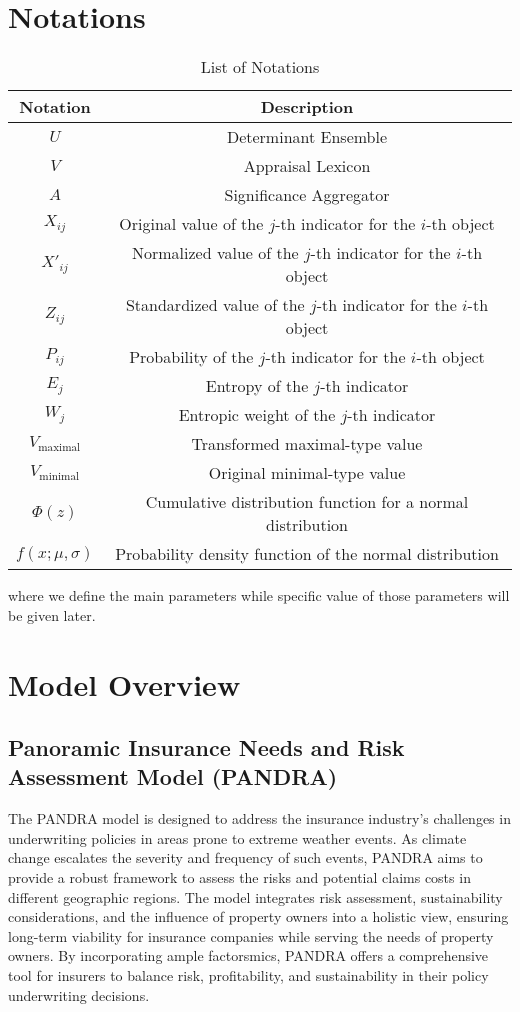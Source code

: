 \documentclass{mcmthesis}
\begin{document}
\section{Notations}
\begin{table}[h]
    \centering
    \caption{List of Notations}
    \begin{tabular}{|c|c|}
    \hline
    \textbf{Notation} & \textbf{Description} \\
    \hline
    $U$ & Determinant Ensemble \\
    $V$ & Appraisal Lexicon \\
    $A$ & Significance Aggregator \\
    $X_{ij}$ & Original value of the $j$-th indicator for the $i$-th object \\
    $X'_{ij}$ & Normalized value of the $j$-th indicator for the $i$-th object \\
    $Z_{ij}$ & Standardized value of the $j$-th indicator for the $i$-th object \\
    $P_{ij}$ & Probability of the $j$-th indicator for the $i$-th object \\
    $E_j$ & Entropy of the $j$-th indicator \\
    $W_j$ & Entropic weight of the $j$-th indicator \\
    $V_{\text{maximal}}$ & Transformed maximal-type value \\
    $V_{\text{minimal}}$ & Original minimal-type value \\
    $\Phi(z)$ & Cumulative distribution function for a normal distribution \\
    $f(x; \mu, \sigma)$ & Probability density function of the normal distribution \\
    \hline
    \end{tabular}
    \label{table:notations}
    \end{table}
    
\noindent where we define the main parameters while specific value of those parameters will be given later.

\section{Model Overview}

\subsection{Panoramic Insurance Needs and Risk Assessment Model (PANDRA)}
The PANDRA model is designed to address the insurance industry's challenges in underwriting policies in areas prone to extreme weather events. As climate change escalates the severity and frequency of such events, PANDRA aims to provide a robust framework to assess the risks and potential claims costs in different geographic regions. The model integrates risk assessment, sustainability considerations, and the influence of property owners into a holistic view, ensuring long-term viability for insurance companies while serving the needs of property owners. By incorporating ample factorsmics, PANDRA offers a comprehensive tool for insurers to balance risk, profitability, and sustainability in their policy underwriting decisions.
\end{document}
